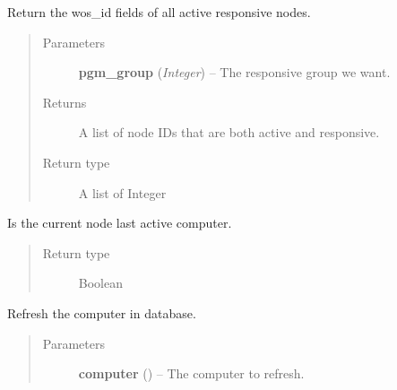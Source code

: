 \documentclass[letterpaper,10pt,english]{sphinxmanual}
\begin{document}

\begin{fulllineitems}
\label{controller:controller.computer.get_active_responsive_nodes}
Return the wos\_id fields of all active responsive nodes.
\begin{quote}\begin{description}
\item[{Parameters}] \leavevmode
\textbf{pgm\_group} (\emph{Integer}) -- The responsive group we want.

\item[{Returns}] \leavevmode
A list of node IDs that are both active and responsive.

\item[{Return type}] \leavevmode
A list of Integer

\end{description}\end{quote}

\end{fulllineitems}


\begin{fulllineitems}
\label{controller:controller.computer.last_active_computer}
Is the current node last active computer.
\begin{quote}\begin{description}
\item[{Return type}] \leavevmode
Boolean

\end{description}\end{quote}

\end{fulllineitems}


\begin{fulllineitems}
\label{controller:controller.computer.refresh_computer}
Refresh the computer in database.
\begin{quote}\begin{description}
\item[{Parameters}] \leavevmode
\textbf{computer} ({\hyperref[models:models.Computer]{}}) -- The computer to refresh.

\end{description}\end{quote}

\end{fulllineitems}
\end{document}
